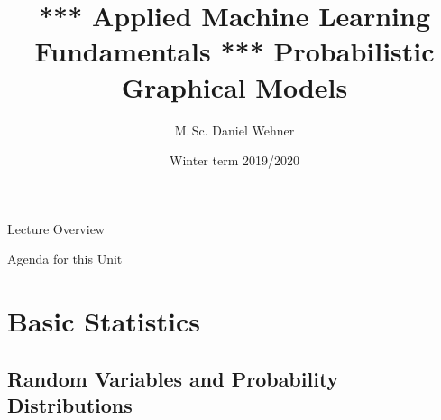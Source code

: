 


\title[Probabilistic Graphical Models]{*** Applied Machine Learning Fundamentals *** Probabilistic Graphical Models}
\author{M.\,Sc. Daniel Wehner}
\date{Winter term 2019/2020}




\maketitlepage


\begin{frame}{Lecture Overview}{}
	\begin{center}
		\Huge{}
	\end{center}
\end{frame}


\begin{frame}{Agenda for this Unit}
	\begin{multicols}{2}
		\tableofcontents
	\end{multicols}
\end{frame}


\section{Basic Statistics}

\subsection{Random Variables and Probability Distributions}

